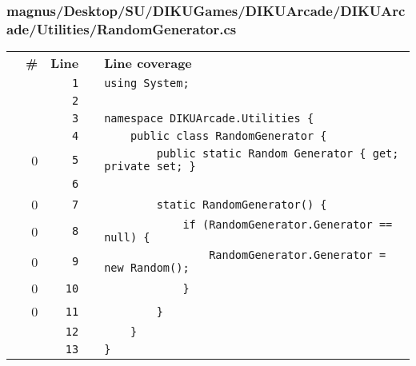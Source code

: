 \documentclass[a4paper,landscape,10pt]{article}
\begin{document}
\subsubsection{magnus/Desktop/SU/DIKUGames/DIKUArcade/DIKUArcade/Utilities/RandomGenerator.cs}
\begin{longtable}[l]{lrrll}
\textbf{} & \textbf{\#} & \textbf{Line} & \textbf{} & \textbf{Line coverage}\\
\cellcolor{gray} &  & \verb~1~ & & \verb~using System;~\\
\cellcolor{gray} &  & \verb~2~ & & \verb~~\\
\cellcolor{gray} &  & \verb~3~ & & \verb~namespace DIKUArcade.Utilities {~\\
\cellcolor{gray} &  & \verb~4~ & & \verb~    public class RandomGenerator {~\\
\cellcolor{red} & 0 & \verb~5~ & & \verb~        public static Random Generator { get; private set; }~\\
\cellcolor{gray} &  & \verb~6~ & & \verb~~\\
\cellcolor{red} & 0 & \verb~7~ & & \verb~        static RandomGenerator() {~\\
\cellcolor{red} & 0 & \verb~8~ & & \verb~            if (RandomGenerator.Generator == null) {~\\
\cellcolor{red} & 0 & \verb~9~ & & \verb~                RandomGenerator.Generator = new Random();~\\
\cellcolor{red} & 0 & \verb~10~ & & \verb~            }~\\
\cellcolor{red} & 0 & \verb~11~ & & \verb~        }~\\
\cellcolor{gray} &  & \verb~12~ & & \verb~    }~\\
\cellcolor{gray} &  & \verb~13~ & & \verb~}~\\
\end{longtable}
\end{document}

